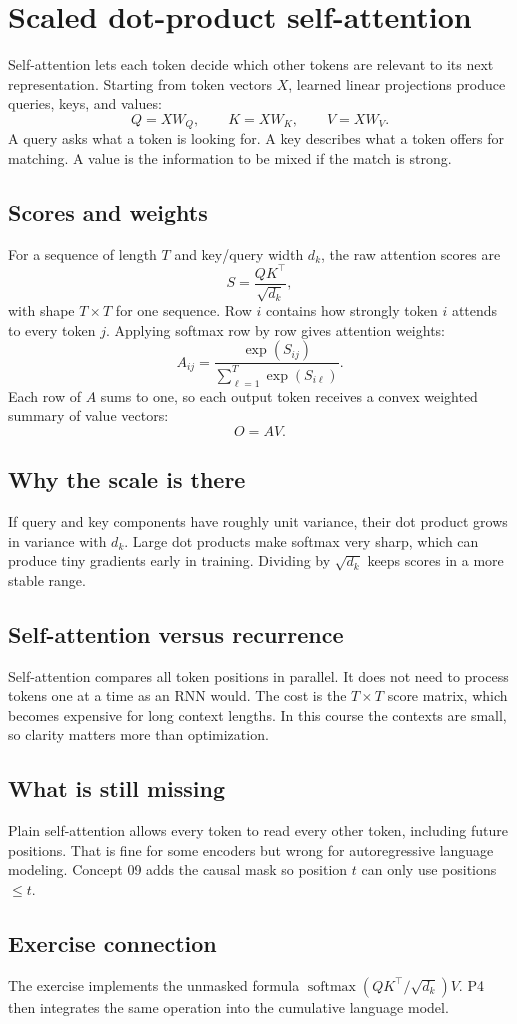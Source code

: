 \section{Scaled dot-product self-attention}\label{sec:08}

Self-attention lets each token decide which other tokens are relevant to its
next representation. Starting from token vectors $X$, learned linear projections
produce queries, keys, and values:
\[
  Q = XW_Q,\qquad K = XW_K,\qquad V = XW_V.
\]
A query asks what a token is looking for. A key describes what a token offers for
matching. A value is the information to be mixed if the match is strong.

\subsection*{Scores and weights}
For a sequence of length $T$ and key/query width $d_k$, the raw attention scores
are
\[
  S = \frac{QK^\top}{\sqrt{d_k}},
\]
with shape $T \times T$ for one sequence. Row $i$ contains how strongly token
$i$ attends to every token $j$. Applying softmax row by row gives attention
weights:
\[
  A_{ij} = \frac{\exp(S_{ij})}{\sum_{\ell=1}^{T}\exp(S_{i\ell})}.
\]
Each row of $A$ sums to one, so each output token receives a convex weighted
summary of value vectors:
\[
  O = AV.
\]

\subsection*{Why the scale is there}
If query and key components have roughly unit variance, their dot product grows
in variance with $d_k$. Large dot products make softmax very sharp, which can
produce tiny gradients early in training. Dividing by $\sqrt{d_k}$ keeps scores
in a more stable range.

\subsection*{Self-attention versus recurrence}
Self-attention compares all token positions in parallel. It does not need to
process tokens one at a time as an RNN would. The cost is the $T \times T$ score
matrix, which becomes expensive for long context lengths. In this course the
contexts are small, so clarity matters more than optimization.

\subsection*{What is still missing}
Plain self-attention allows every token to read every other token, including
future positions. That is fine for some encoders but wrong for autoregressive
language modeling. Concept 09 adds the causal mask so position $t$ can only use
positions $\le t$.

\subsection*{Exercise connection}
The exercise implements the unmasked formula
$\operatorname{softmax}(QK^\top/\sqrt{d_k})V$. P4 then integrates the same
operation into the cumulative language model.
